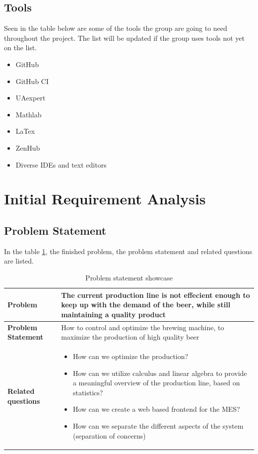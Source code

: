 \subsection{Tools}
Seen in the table below are some of the tools the group are going to need
throughout the project. The list will be updated if the group uses tools not
yet on the list.

\begin{itemize}
    \item GitHub
    \item GitHub CI
    \item UAexpert
    \item Mathlab
    \item LaTex
    \item ZenHub
    \item Diverse IDEs and text editors
\end{itemize}

\section{Initial Requirement Analysis}

\subsection{Problem Statement}
In the table \ref{table:problem-statement}, the finished problem, the problem statement and related questions are listed.
\begin{table}[ht]
    \begin{tabularx}{\textwidth}{|>{\RaggedRight}p{4cm}|>{\RaggedRight}X|}
        \hline
        \textbf{Problem} & The current production line is not effecient enough to keep up with the demand of the beer, while still maintaining a quality product\\
        \hline
        \textbf{Problem Statement} & How to control and optimize the brewing machine, to maximize the production of high quality beer\\
        \hline
        \textbf{Related questions} & 
            \begin{itemize}
                \item How can we optimize the production?
                \item How can we utilize calculus and linear algebra to provide a meaningful overview of the production line, based on statistics?
                \item How can we create a web based frontend for the MES?
                \item How can we separate the different aspects of the system (separation of concerns)
            \end{itemize}
        \\ 
        \hline
    \end{tabularx}
    \caption{Problem statement showcase} 
    \label{table:problem-statement}
\end{table} 

